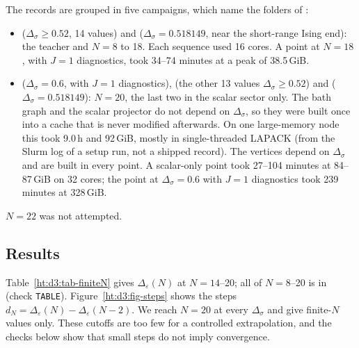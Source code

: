 The records are grouped in five campaigns, which name the folders of :
\begin{itemize}
\item {} ($\Delta_\sigma\geq0.52$, 14 values) and  ($\Delta_\sigma=0.518149$, near the
 short-range Ising end): the teacher and $N=8$ to 18. Each sequence used 16 cores. A point at $N=18$, with $J=1$
 diagnostics, took 34--74 minutes at a peak of 38.5\,GiB. %
\item {} ($\Delta_\sigma=0.6$, with $J=1$ diagnostics),  (the other 13 values
 $\Delta_\sigma\geq0.52$) and  ($\Delta_\sigma=0.518149$): $N=20$, the last two in the scalar sector
 only. The bath graph and the scalar projector do not depend on $\Delta_\sigma$, so they were built once into a cache
 that is never modified afterwards. On one large-memory node this took 9.0\,h and 92\,GiB, mostly in single-threaded
 LAPACK (from the Slurm log of a setup run, not a shipped record). The vertices depend on $\Delta_\sigma$ and are
 built in every point. A scalar-only point took 27--104 minutes at 84--87\,GiB on 32 cores; the point at
 $\Delta_\sigma=0.6$ with $J=1$ diagnostics took 239 minutes at 328\,GiB. %
\end{itemize}

$N=22$ was not attempted.

\subsection{Results}\label{ht:d3:results}

Table~\ref{ht:d3:tab-finiteN} gives $\Delta_\varepsilon(N)$ at $N=14$--20; all of $N=8$--20 is in
 (check \texttt{TABLE}). Figure~\ref{ht:d3:fig-steps} shows the steps
$d_N=\Delta_\varepsilon(N)-\Delta_\varepsilon(N-2)$. We reach $N=20$ at every $\Delta_\sigma$ %
and give finite-$N$ values only. These cutoffs are too few for a controlled extrapolation, and the checks below
show that small steps do not imply convergence.

\begin{table}[h]
\centering
\footnotesize

\caption{$\Delta_\varepsilon$ from the $d=3$ window truncation at bath cutoffs $N=14$--20, with the last step
$d_{20}=\Delta_\varepsilon(20)-\Delta_\varepsilon(18)$ and its ratio to the previous one. Finite-cutoff values, not
limits.}
\label{ht:d3:tab-finiteN}
\end{table}

